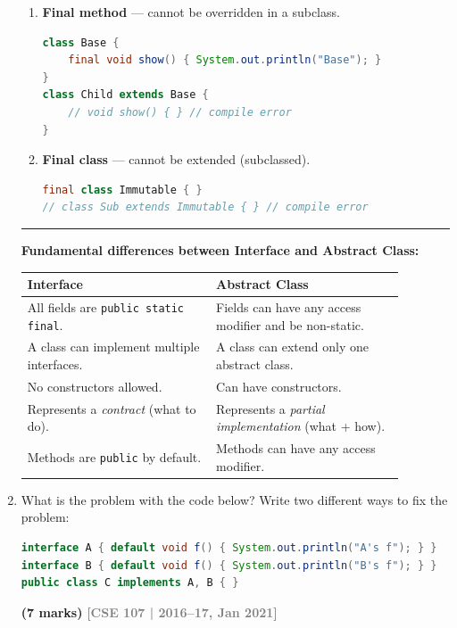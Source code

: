 \documentclass[12pt,a3paper]{article}
\newcommand{\yr}[1]{\hfill\textcolor{gray}{\small\textbf{[#1]}}}
\newcommand{\mk}[1]{\textcolor{orange!70!black}{\small\textbf{(#1 marks)}}}
\begin{document}
\begin{enumerate}
\begin{tcolorbox}
\begin{enumerate}[label=\textbf{\arabic*.}]
  \item \textbf{Final method} --- cannot be overridden in a subclass.
\begin{lstlisting}[language=Java]
class Base {
    final void show() { System.out.println("Base"); }
}
class Child extends Base {
    // void show() { } // compile error
}
\end{lstlisting}

  \item \textbf{Final class} --- cannot be extended (subclassed).
\begin{lstlisting}[language=Java]
final class Immutable { }
// class Sub extends Immutable { } // compile error
\end{lstlisting}
\end{enumerate}

\medskip
\textcolor{cD}{\rule{\textwidth}{0.4pt}}

\textbf{Fundamental differences between Interface and Abstract Class:}

\begin{center}
\small
\begin{tabular}{@{}p{0.44\linewidth}p{0.44\linewidth}@{}}
\toprule
\textbf{Interface} & \textbf{Abstract Class} \\
\midrule
All fields are \texttt{public static final}. &
Fields can have any access modifier and be non-static. \\[4pt]
A class can implement multiple interfaces. &
A class can extend only one abstract class. \\[4pt]
No constructors allowed. &
Can have constructors. \\[4pt]
Represents a \emph{contract} (what to do). &
Represents a \emph{partial implementation} (what + how). \\[4pt]
Methods are \texttt{public} by default. &
Methods can have any access modifier. \\
\bottomrule
\end{tabular}
\end{center}

\end{tcolorbox}



\item What is the problem with the code below? Write two different ways to fix the problem:
\begin{lstlisting}[language=Java]
interface A { default void f() { System.out.println("A's f"); } }
interface B { default void f() { System.out.println("B's f"); } }
public class C implements A, B { }
\end{lstlisting}
\mk{7}
\yr{CSE 107 | 2016--17, Jan 2021}


\end{enumerate}
\end{document}
